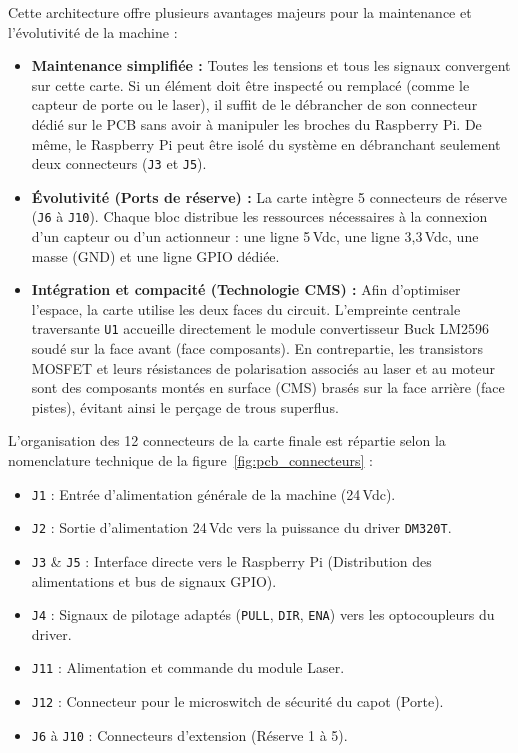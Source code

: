     Cette architecture offre plusieurs avantages majeurs pour la maintenance et l'évolutivité de la machine :
    \begin{itemize}
        \item \textbf{Maintenance simplifiée :} Toutes les tensions et tous les signaux convergent sur cette carte. Si un élément doit être inspecté ou remplacé (comme le capteur de porte ou le laser), il suffit de le débrancher de son connecteur dédié sur le PCB sans avoir à manipuler les broches du Raspberry Pi. De même, le Raspberry Pi peut être isolé du système en débranchant seulement deux connecteurs (\texttt{J3} et \texttt{J5}).
        \item \textbf{Évolutivité (Ports de réserve) :} La carte intègre 5 connecteurs de réserve (\texttt{J6} à \texttt{J10}). Chaque bloc distribue les ressources nécessaires à la connexion d'un capteur ou d'un actionneur : une ligne 5\,Vdc, une ligne 3,3\,Vdc, une masse (GND) et une ligne GPIO dédiée.
        \item \textbf{Intégration et compacité (Technologie CMS) :} Afin d'optimiser l'espace, la carte utilise les deux faces du circuit. L'empreinte centrale traversante \texttt{U1} accueille directement le module convertisseur Buck LM2596 soudé sur la face avant (face composants). En contrepartie, les transistors MOSFET et leurs résistances de polarisation associés au laser et au moteur sont des composants montés en surface (CMS) brasés sur la face arrière (face pistes), évitant ainsi le perçage de trous superflus.
    \end{itemize}

    L'organisation des 12 connecteurs de la carte finale est répartie selon la nomenclature technique de la figure~\ref{fig:pcb_connecteurs} :
    \begin{itemize}
        \item \texttt{J1} : Entrée d'alimentation générale de la machine (24\,Vdc).
        \item \texttt{J2} : Sortie d'alimentation 24\,Vdc vers la puissance du driver \texttt{DM320T}.
        \item \texttt{J3} \& \texttt{J5} : Interface directe vers le Raspberry Pi (Distribution des alimentations et bus de signaux GPIO).
        \item \texttt{J4} : Signaux de pilotage adaptés (\texttt{PULL}, \texttt{DIR}, \texttt{ENA}) vers les optocoupleurs du driver.
        \item \texttt{J11} : Alimentation et commande du module Laser.
        \item \texttt{J12} : Connecteur pour le microswitch de sécurité du capot (Porte).
        \item \texttt{J6} à \texttt{J10} : Connecteurs d'extension (Réserve 1 à 5).
    \end{itemize}

